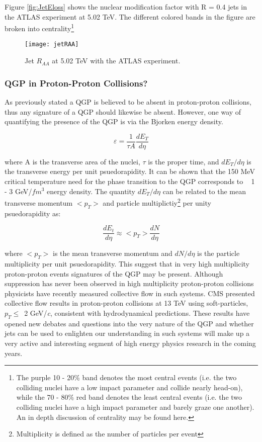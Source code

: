 Figure \ref{fig:JetEloss} shows the nuclear modification factor with R = 0.4 jets in the ATLAS experiment at 5.02 TeV\cite{Aaboud:2018twu}.  The different colored bands in the figure are broken into centrality\footnote{The purple 10 - 20\% band denotes the most central events (i.e. the two colliding nuclei have a low impact parameter and collide nearly head-on), while the 70 - 80\% red band denotes the least central events (i.e. the two colliding nuclei have a high impact parameter and barely graze one another).  An in depth discussion of centrality may be found here\cite{Klochkov_2017}.}

\begin{figure}[h]
\texttt{[image: jetRAA]}
\centering
\caption{Jet $R_{AA}$ at 5.02 TeV with the ATLAS experiment\cite{Aaboud:2018twu}.}
\label{fig:JetRAA}
\end{figure}



\subsubsection{QGP in Proton-Proton Collisions?}
As previously stated a QGP is believed to be absent in proton-proton collisions, thus any signature of a QGP should likewise be absent.  However, one way of quantifying the presence of the QGP is via the Bjorken energy density.  

\begin{equation}
\varepsilon = \frac{1}{\tau A} \frac{dE_{T}}{d \eta}
\label{eq:bjorkenEt}
\end{equation}

\noindent
where A is the transverse area of the nuclei, $\tau$ is the proper time, and $dE_{T}/d \eta$ is the transverse energy per unit psuedorapidity.  It can be shown that  the 150 MeV critical temperature need for the phase transition to the QGP corresponds to ~ 1 - 3 GeV/$fm^{3}$ energy density.  The quantity $dE_{T}/d \eta$ can be related to the mean transverse momentum $<p_{T}>$ and particle multiplictiy\footnote{Multiplicity is defined as the number of particles per event} per unity psuedorapidity as:

\begin{equation}
\frac{dE_{t}}{d \eta}  \approx  <p_{T}> \frac{dN}{d\eta}
\label{eq:Et}
\end{equation}

where $ <p_{T} >$ is the mean transverse momentum and $dN/d\eta$ is the particle multiplicity per unit psuedorapidity.
This suggest that in very high multiplicity proton-proton events signatures of the QGP may be present.  Although suppression has never been observed in high multiplicity proton-proton collisions physicists have recently measured collective flow in such systems\cite{Nagle:2018nvi}.  CMS presented collective flow results in proton-proton collisions at 13 TeV using soft-particles, $p_{T} \leq\,$ 2 GeV/\textit{c}, consistent with hydrodynamical predictions\cite{ZHAO2018495}. These results have opened new debates and questions into the very nature of the QGP and whether jets can be used to enlighten our understanding in such systems will make up a very active and interesting segment of high energy physics research in the coming years.